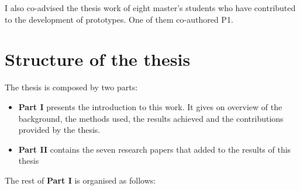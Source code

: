 I also co-advised the thesis work of eight master's students who have contributed to the development of prototypes. One of them co-authored P1.

\section{Structure of the thesis}\label{structure-of-the-thesis}

The thesis is composed by two parts:

\begin{itemize}
	\item \textbf{Part I} presents the introduction to this work. It gives on overview of the background, the methods used, the results achieved and the contributions provided by the thesis.
	\item \textbf{Part II} contains the seven research papers that added to the results of this thesis
\end{itemize}

The rest of \textbf{Part I} is organised as follows:

